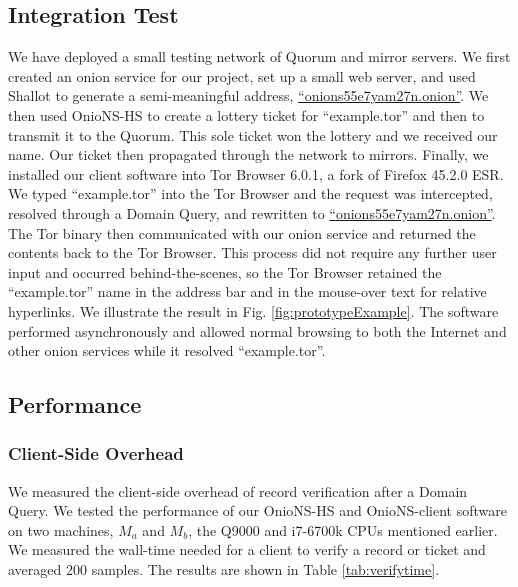 \documentclass[USenglish,oneside,twocolumn]{article}
\begin{document}
\subsection{Integration Test}

We have deployed a small testing network of Quorum and mirror servers. We first created an onion service for our project, set up a small web server, and used Shallot to generate a semi-meaningful address, \href{http://onions55e7yam27n.onion}{``onions55e7yam27n.onion''}. We then used OnioNS-HS to create a lottery ticket for ``example.tor'' and then to transmit it to the Quorum. This sole ticket won the lottery and we received our name. Our ticket then propagated through the network to mirrors. Finally, we installed our client software into Tor Browser 6.0.1, a fork of Firefox 45.2.0 ESR. We typed ``example.tor'' into the Tor Browser and the request was intercepted, resolved through a Domain Query, and rewritten to \href{http://onions55e7yam27n.onion}{``onions55e7yam27n.onion''}. The Tor binary then communicated with our onion service and returned the contents back to the Tor Browser. This process did not require any further user input and occurred behind-the-scenes, so the Tor Browser retained the ``example.tor'' name in the address bar and in the mouse-over text for relative hyperlinks. We illustrate the result in Fig. \ref{fig:prototypeExample}. The software performed asynchronously and allowed normal browsing to both the Internet and other onion services while it resolved ``example.tor''.


\subsection{Performance}

\subsubsection{Client-Side Overhead}

We measured the client-side overhead of record verification after a Domain Query. We tested the performance of our OnioNS-HS and OnioNS-client software on two machines, $ M_{a} $ and $ M_{b} $, the Q9000 and i7-6700k CPUs mentioned earlier. We measured the wall-time needed for a client to verify a record or ticket and averaged 200 samples. The results are shown in Table \ref{tab:verifytime}.
\end{document}
